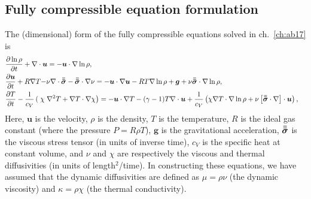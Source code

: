 \subsection{Fully compressible equation formulation}
The (dimensional) form of the fully compressible equations solved in ch.~\ref{ch:ab17} is 
\begin{align}
&\begin{aligned}
&\frac{\partial \ln\rho}{\partial t} + \nabla\cdot\bm{u} 
    = -\bm{u}\cdot\nabla\ln\rho,
\end{aligned}\\
&\begin{aligned}
\frac{\partial\bm{u}}{\partial t} + R \nabla T - 
&\nu\nabla\cdot\bm{\bar{\bar{\sigma}}} - \bm{\bar{\bar{\sigma}}}\cdot\nabla\nu =
-\bm{u}\cdot\nabla\bm{u} - RT\nabla\ln\rho + \bm{g} + 
\nu\bm{\bar{\bar{\sigma}}}\cdot\nabla\ln\rho,
\end{aligned}\\
&\begin{aligned}
\frac{\partial T}{\partial t} -\frac{1}{c_V}\left(\right.\chi&\left.
    \nabla^2 T + \nabla T\cdot\nabla\chi\right) =
	-\bm{u}\cdot\nabla T - (\gamma-1)T\nabla\cdot{\bm{u}}
	+ \frac{1}{c_V}\left(\chi\nabla T \cdot\nabla\ln\rho +
	\nu\left[\bm{\bar{\bar{\sigma}}}\cdot\nabla\right]\cdot\bm{u}\right), 
\end{aligned}
\end{align}
Here, $\bm{u}$ is the velocity, $\rho$ is the density, $T$ is the temperature, $R$ is the ideal gas constant (where the pressure $P = R\rho T$), $\bm{g}$ is the gravitational acceleration, $\bm{\bar{\bar{\sigma}}}$ is the viscous stress tensor (in units of inverse time), $c_V$ is the specific heat at constant volume, and $\nu$ and $\chi$ are respectively the viscous and thermal diffusivities (in units of length$^2$/time).
In constructing these equations, we have assumed that the dynamic diffusivities are defined as $\mu = \rho \nu$ (the dynamic viscosity) and $\kappa = \rho \chi$ (the thermal conductivity).

